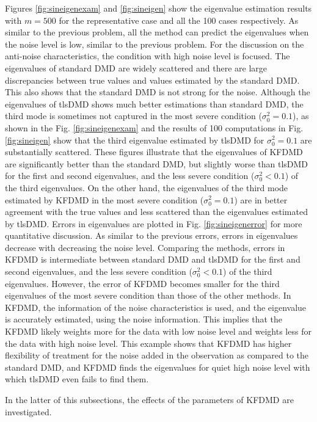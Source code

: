 \documentclass[aip,graphicx]{revtex4-1}
\begin{document}
Figures \ref{fig:sineigenexam} and \ref{fig:sineigen} show the eigenvalue estimation results with $m=500$ for the representative case and all the 100 cases respectively.
As similar to the previous problem, all the method can predict the eigenvalues when the noise level is low, similar to the previous problem.
For the discussion on the anti-noise characteristics, the condition with high noise level is focused. 
The eigenvalues of standard DMD are widely scattered and there are large discrepancies between true values and values estimated by the standard DMD. This also shows that the standard DMD is not strong for the noise. Although the eigenvalues of tlsDMD shows much better estimations than standard DMD, the third mode is sometimes not captured in the most severe condition ($\sigma^2_0=0.1$), as shown in the Fig. \ref{fig:sineigenexam} and the results of 100 computations in Fig. \ref{fig:sineigen} show that the third eigenvalue estimated by tlsDMD for $\sigma_0^2=0.1$ are substantially scattered. These figures illustrate that the eigenvalues of KFDMD are significantly better than the standard DMD, but slightly worse than tlsDMD for the first and second eigenvalues, and the less severe condition ($\sigma^2_0<0.1$) of the third eigenvalues. On the other hand, the eigenvalues of the third mode estimated by KFDMD  in the most severe condition ($\sigma^2_0=0.1$) are in better agreement with the true values and less scattered than the eigenvalues estimated by tlsDMD. Errors in eigenvalues are plotted in Fig. \ref{fig:sineigenerror} for more quantitative discussion. As similar to the previous errors, errors in eigenvalues decrease with decreasing the noise level. Comparing the methods, errors in KFDMD is intermediate between standard DMD and tlsDMD for the first and second eigenvalues, and the less severe condition ($\sigma^2_0<0.1$) of the third eigenvalues. However, the error of KFDMD becomes smaller for the third eigenvalues of the most severe condition than those of the other methods. 
In KFDMD, the information of the noise characteristics is used, and the eigenvalue is accurately estimated, using the noise information. This implies that the KFDMD likely weights more for the data with low noise level and weights less for the data with high noise level.
This example shows that KFDMD has higher flexibility of treatment for the noise added in the observation as compared to the standard DMD, and KFDMD finds the eigenvalues for quiet high noise level with which tlsDMD even fails to find them.

In the latter of this subsections, the effects of the parameters of KFDMD are investigated. 
\end{document}
